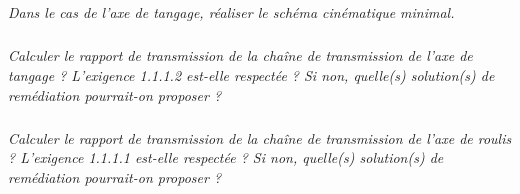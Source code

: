 \documentclass[10pt]{article}
\newif\ifprof
\begin{document}
\subparagraph{}
\textit{Dans le cas de l'axe de tangage, réaliser le schéma cinématique minimal.}
\ifprof
\begin{corrige}
\end{corrige}
\else
\fi

\subparagraph{}
\textit{Calculer le rapport de transmission de la chaîne de transmission de l'axe de tangage ? L'exigence 1.1.1.2 est-elle respectée ? Si non, quelle(s) solution(s) de remédiation pourrait-on proposer ?}
\ifprof
\begin{corrige}
$$
R_T = (-1)^n \dfrac{80\cdot 47 \cdot 58 \cdot 36}{20\cdot 25\cdot 12 \cdot 10 } = 130,85
$$

Ceci est inférieur à ce qui est préconisé par le cahier des charges. 

Pour respecter le cahier des charges, on peut :
\begin{itemize}
\item choisir un autre moteur;
\item changer le nombre de dents d'une des roues. Il suffirait pour cela que,  par exemple, la roue de sortie comporte 39 dents. 
\end{itemize}
\end{corrige}
\else
\fi

\subparagraph{}
\textit{Calculer le rapport de transmission de la chaîne de transmission de l'axe de roulis ? L'exigence 1.1.1.1 est-elle respectée ? Si non, quelle(s) solution(s) de remédiation pourrait-on proposer ?}
\ifprof
\begin{corrige}
Le rapport de transmission du second train est de 201,3 ce qui est compatible avec le cahier des charges.
\end{corrige}
\else
\fi
\end{document}
